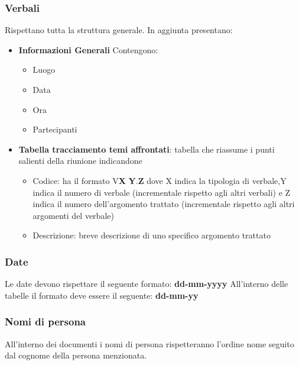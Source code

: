 \subsubsection{Verbali}
Rispettano tutta la struttura generale.
In aggiunta presentano:
\begin{itemize} 
    \item \textbf{Informazioni Generali}
    Contengono:
    \begin{itemize} 
        \item Luogo
        \item Data
        \item Ora
        \item Partecipanti
    \end{itemize}
\item \textbf{Tabella tracciamento temi affrontati}:
tabella che riassume i punti salienti della riunione indicandone
    \begin{itemize} 
        \item Codice: ha il formato V\textbf{X} \textbf{Y}.\textbf{Z} dove X indica la tipologia di verbale,Y indica il numero di verbale (incrementale rispetto agli altri verbali) 
        e Z indica il numero dell'argomento trattato (incrementale rispetto agli altri argomenti del verbale) 
        \item Descrizione: breve descrizione di uno specifico argomento trattato
    \end{itemize}

\end{itemize}

\subsubsection{Date}
Le date devono rispettare il seguente formato: \textbf{dd-mm-yyyy}
All'interno delle tabelle il formato deve essere il seguente: \textbf{dd-mm-yy}
\subsubsection{Nomi di persona}
All'interno dei documenti i nomi di persona rispetteranno l'ordine nome seguito dal cognome della persona menzionata.

